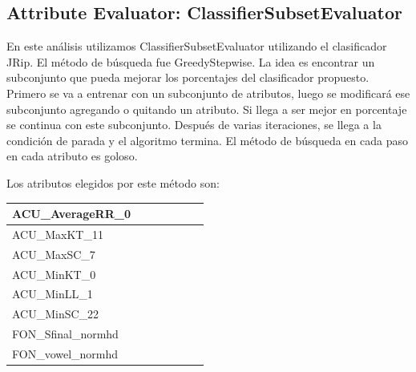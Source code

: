 \documentclass[11pt,a4paper,twoside]{tesis}
\begin{document}
\subsection*{Attribute Evaluator: ClassifierSubsetEvaluator}

En este análisis utilizamos ClassifierSubsetEvaluator utilizando el clasificador JRip. El método de búsqueda fue GreedyStepwise. La idea es encontrar un subconjunto que pueda mejorar los porcentajes del clasificador propuesto. Primero se va a entrenar con un subconjunto de atributos, luego se modificará ese subconjunto agregando o quitando un atributo. Si llega a ser mejor en porcentaje se continua con este subconjunto. Después de varias iteraciones, se llega a la condición de parada y el algoritmo termina. El método de búsqueda en cada paso en cada atributo es goloso.

Los atributos elegidos por este método son:


\begin{table}[H]
\centering
\begin{tabular}{|l|c|c|c|c|c|c|}
\hline
ACU\_AverageRR\_0 \\ \hline 
ACU\_MaxKT\_11 \\ \hline
ACU\_MaxSC\_7 \\ \hline
ACU\_MinKT\_0 \\ \hline
ACU\_MinLL\_1 \\ \hline
ACU\_MinSC\_22 \\ \hline
FON\_Sfinal\_normhd \\ \hline
FON\_vowel\_normhd \\ \hline
 
\end{tabular}
\end{table}
\end{document}
